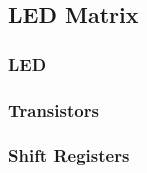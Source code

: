\subsection{LED Matrix}

	\subsubsection{LED}
	
	\subsubsection{Transistors}
	
	\subsubsection{Shift Registers}
